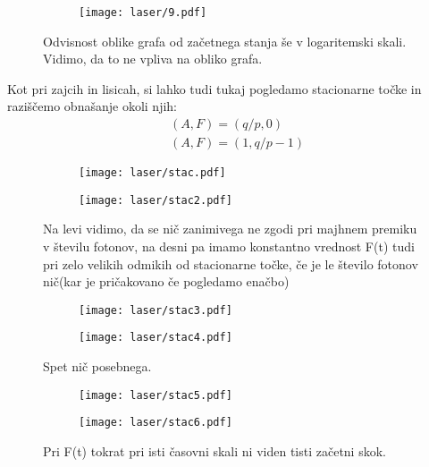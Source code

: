 \documentclass{article}
\begin{document}
\begin{figure}[H]
\centering
\begin{subfigure}{.49\textwidth}
\texttt{[image: laser/9.pdf]}
\end{subfigure}
\caption*{Odvisnost oblike grafa od začetnega stanja še v logaritemski skali. Vidimo, da to ne vpliva na obliko grafa.}
\end{figure}

Kot pri zajcih in lisicah, si lahko tudi tukaj pogledamo stacionarne točke in raziščemo obnašanje okoli njih:
\begin{align*}
&(A,F) = (q/p,0)\\
&(A,F) = (1,q/p - 1)
\end{align*}

\begin{figure}[H]
\centering
\begin{subfigure}{.49\textwidth}
\texttt{[image: laser/stac.pdf]}
\end{subfigure}
\begin{subfigure}{.49\textwidth}
\texttt{[image: laser/stac2.pdf]}
\end{subfigure}
\caption*{Na levi vidimo, da se nič zanimivega ne zgodi pri majhnem premiku v številu fotonov, na desni pa imamo konstantno vrednost F(t) tudi pri zelo velikih odmikih od stacionarne točke, če je le število fotonov nič(kar je pričakovano če pogledamo enačbo)}
\end{figure}
\begin{figure}[H]
\centering
\begin{subfigure}{.49\textwidth}
\texttt{[image: laser/stac3.pdf]}
\end{subfigure}
\begin{subfigure}{.49\textwidth}
\texttt{[image: laser/stac4.pdf]}
\end{subfigure}
\caption*{Spet nič posebnega.}
\end{figure}

\begin{figure}[H]
\centering
\begin{subfigure}{.49\textwidth}
\texttt{[image: laser/stac5.pdf]}
\end{subfigure}
\begin{subfigure}{.49\textwidth}
\texttt{[image: laser/stac6.pdf]}
\end{subfigure}
\caption*{Pri F(t) tokrat pri isti časovni skali ni viden tisti začetni skok.}
\end{figure}
\end{document}
